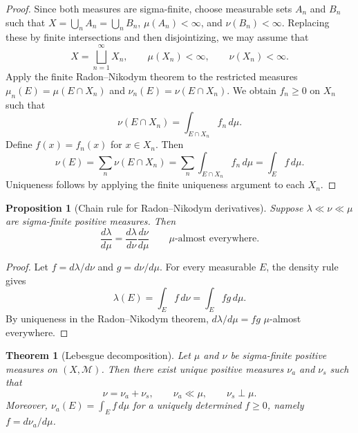 \documentclass[11pt,openany]{book}
\numberwithin{equation}{chapter}
\theoremstyle{definition}
\theoremstyle{plain}
\newtheorem{theorem}[definition]{Theorem}
\newtheorem{proposition}[definition]{Proposition}
\theoremstyle{remark}
\newcommand{\M}{\mathcal{M}}
\newcommand{\1}{\mathbf{1}}
\newcommand{\dd}{\,d}
\begin{document}
\begin{proof}
Since both measures are sigma-finite, choose measurable sets \(A_n\) and \(B_n\) such that \(X=\bigcup_nA_n=\bigcup_nB_n\), \(\mu(A_n)<\infty\), and \(\nu(B_n)<\infty\). Replacing these by finite intersections and then disjointizing, we may assume that
\[
  X=\bigsqcup_{n=1}^{\infty}X_n,
  \qquad
  \mu(X_n)<\infty,
  \qquad
  \nu(X_n)<\infty.
\]
Apply the finite Radon--Nikodym theorem to the restricted measures \(\mu_n(E)=\mu(E\cap X_n)\) and \(\nu_n(E)=\nu(E\cap X_n)\). We obtain \(f_n\geq0\) on \(X_n\) such that
\[
  \nu(E\cap X_n)=\int_{E\cap X_n}f_n\dd\mu.
\]
Define \(f(x)=f_n(x)\) for \(x\in X_n\). Then
\[
  \nu(E)=\sum_n\nu(E\cap X_n)
  =\sum_n\int_{E\cap X_n}f_n\dd\mu
  =\int_Ef\dd\mu.
\]
Uniqueness follows by applying the finite uniqueness argument to each \(X_n\).
\end{proof}

\begin{proposition}[Chain rule for Radon--Nikodym derivatives]
Suppose \(\lambda\ll\nu\ll\mu\) are sigma-finite positive measures. Then
\[
  \frac{d\lambda}{d\mu}
  =\frac{d\lambda}{d\nu}\frac{d\nu}{d\mu}
  \qquad \mu\text{-almost everywhere}.
\]
\end{proposition}

\begin{proof}
Let \(f=d\lambda/d\nu\) and \(g=d\nu/d\mu\). For every measurable \(E\), the density rule gives
\[
  \lambda(E)=\int_Ef\dd\nu=\int_Efg\dd\mu.
\]
By uniqueness in the Radon--Nikodym theorem, \(d\lambda/d\mu=fg\) \(\mu\)-almost everywhere.
\end{proof}

\begin{theorem}[Lebesgue decomposition]
Let \(\mu\) and \(\nu\) be sigma-finite positive measures on \((X,\M)\). Then there exist unique positive measures \(\nu_a\) and \(\nu_s\) such that
\[
  \nu=\nu_a+\nu_s,
  \qquad
  \nu_a\ll\mu,
  \qquad
  \nu_s\perp\mu.
\]
Moreover, \(\nu_a(E)=\int_E f\dd\mu\) for a uniquely determined \(f\geq0\), namely \(f=d\nu_a/d\mu\).
\end{theorem}
\end{document}
